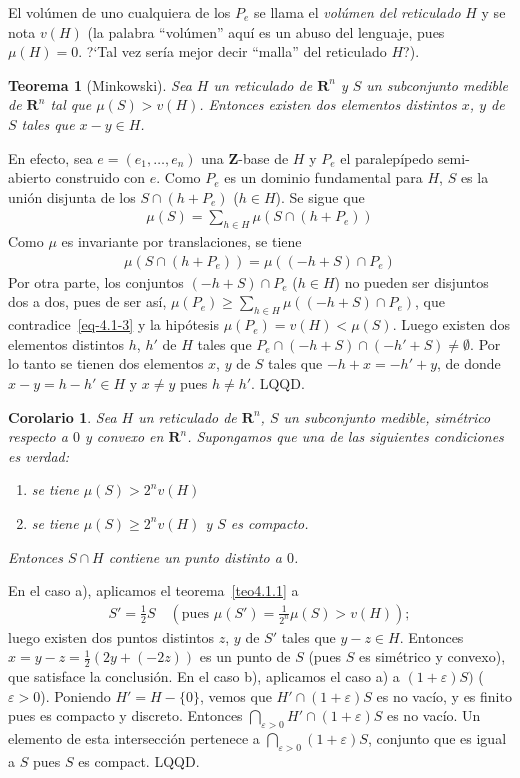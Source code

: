 \documentclass[bibtotoc,leqno,spanish]{amsbook}
\newcommand{\RR}{\mathbf{R}}
\newcommand{\ZZ}{\mathbf{Z}}
\newcommand{\QED}{LQQD.}
\numberwithin{equation}{section}
\theoremstyle{note}
\theoremstyle{note}
\newtheorem{theorem}{Teorema}
\newtheorem*{corollary*}{Corolario}
\theoremstyle{rem}
\numberwithin{theorem}{section}
\numberwithin{proposition}{section}
\numberwithin{definition}{section}
\numberwithin{lemma}{section}
\numberwithin{corollary}{section}
\numberwithin{example}{section}
\numberwithin{footnote}{section}%
\begin{document}
El vol\'umen de uno cualquiera de los $P_{e}$ se llama el {\em vol\'umen del reticulado} $H$
y se nota
$v(H)$ (la palabra ``vol\'umen'' aqu\'i es un abuso del lenguaje, pues $\mu(H) = 0$. ?`Tal
vez ser\'ia mejor decir ``malla'' del reticulado $H$?).

\begin{theorem}[Minkowski]\label{teo4.1.2}
Sea $H$ un reticulado de $\RR^{n}$ y $S$ un subconjunto medible de $\RR^{n}$ tal
que $\mu(S) > v(H)$. Entonces existen
dos elementos distintos $x$, $y$ de $S$ tales que $x-y\in H$.
\end{theorem}

En efecto, sea $e = (e_{1},\dots,e_{n})$ una $\ZZ$-base de $H$ y $P_{e}$ el
paralep\'ipedo semi-abierto construido
con $e$. Como $P_{e}$ es un dominio fundamental para $H$, $S$ es la uni\'on disjunta de
los $S\cap (h+P_{e})$
($h\in H$). Se sigue que
\begin{gather}\label{eq-4.1-3}
\mu(S) = \sum_{h\in H}\mu(S\cap (h+P_{e}))
\end{gather}
Como $\mu$ es invariante por translaciones, se tiene
\begin{gather*}
\mu(S\cap (h+P_{e})) = \mu((-h+S)\cap P_{e})
\end{gather*}
Por otra parte, los conjuntos $(-h+S)\cap P_{e}$ ($h\in H$) no pueden ser disjuntos dos a
dos, pues de ser as\'i,
$\mu(P_{e})\geq\sum_{h\in H}\mu((-h+S)\cap P_{e})$, que contradice~\eqref{eq-4.1-3} y la
hip\'otesis $\mu(P_{e})=v(H)<\mu(S)$.
Luego existen dos elementos distintos $h$, $h'$ de $H$ tales que
$P_{e}\cap (-h+S)\cap (-h'+S)\neq\emptyset$.
Por lo tanto se tienen dos elementos $x$, $y$ de $S$ tales que $-h+x=-h'+y$, de donde
$x-y=h-h'\in H$ y
$x\neq y$ pues $h\neq h'$. \QED

\begin{corollary*}
Sea $H$ un reticulado de $\RR^{n}$, $S$ un subconjunto medible, sim\'etrico respecto a
$0$ y convexo en $\RR^{n}$.
Supongamos que una de las siguientes condiciones es verdad:
\begin{enumerate}
\item[a)] se tiene $\mu(S) > 2^{n}v(H)$
\item[b)] se tiene $\mu(S)\geq 2^{n}v(H)$ y $S$ es compacto.
\end{enumerate}
Entonces $S\cap H$ contiene un punto distinto a $0$.
\end{corollary*}

En el caso a), aplicamos el teorema~\ref{teo4.1.1} a
\begin{gather*}
S'=\frac{1}{2}S\quad\left(\text{pues }\mu(S')=\frac{1}{2^{n}}\mu(S)>v(H)\right);
\end{gather*}
luego existen dos puntos distintos $z$, $y$ de $S'$ tales que $y-z\in H$. Entonces
$x=y-z=\frac{1}{2}(2y+(-2z))$ es un punto de $S$ (pues $S$ es sim\'etrico y convexo),
que satisface la conclusi\'on. En el caso b), aplicamos el caso a) a
$(1+\varepsilon)S)$ ($\varepsilon > 0$). Poniendo $H' = H-\{0\}$, vemos que
$H'\cap (1+\varepsilon)S$ es no vac\'io, y es finito pues es compacto y discreto. Entonces
$\bigcap_{\varepsilon>0}H'\cap (1+\varepsilon)S$ es no vac\'io. Un elemento de esta intersecci\'on pertenece
a $\bigcap_{\varepsilon>0}(1+\varepsilon)S$, conjunto que es igual a $S$ pues $S$ es compact. \QED
\end{document}
